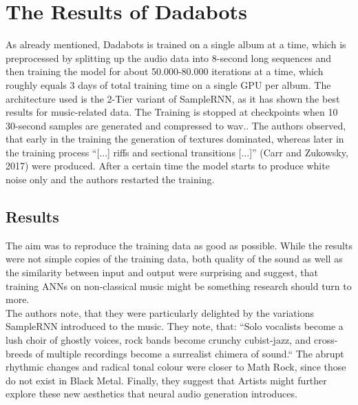 \documentclass[a4paper, 11pt]{report}
\begin{document}
\chapter{The Results of Dadabots}
As already mentioned, Dadabots is trained on a single album at a time, which 
is preprocessed by splitting up the audio data into 8-second long sequences and 
then training the model for about 50.000-80.000 iterations at a time, which 
roughly equals 3 days of total training time on a single GPU per album. The 
architecture used is the 2-Tier variant of SampleRNN, as it has shown the best 
results for music-related data. The Training is stopped at checkpoints when 10 
30-second samples are generated and compressed to wav.. The authors observed, 
that early in the training the generation of textures dominated, whereas later 
in the training process “[...] riffs and sectional transitions [...]” (Carr
and Zukowsky, 2017) were 
produced. After a certain time the model starts to produce white noise only 
and the authors restarted the training.

\section{Results}
The aim was to reproduce the training data as good as possible. While the 
results were not simple copies of the training data, both quality of the sound 
as well as the similarity between input and output were surprising and suggest, 
that training ANNs on non-classical music might be something research should 
turn to more. \\
The authors note, that they were particularly delighted by the variations 
SampleRNN introduced to the music. They note, that: “Solo vocalists become a 
lush choir of ghostly voices, rock bands become crunchy cubist-jazz, and cross-
breeds of multiple recordings become a surrealist chimera of sound.“ The abrupt 
rhythmic changes and radical tonal colour were closer to Math Rock, since those 
do not exist in Black Metal. Finally, they suggest that Artists might further 
explore these new aesthetics that neural audio generation introduces.
\end{document}
